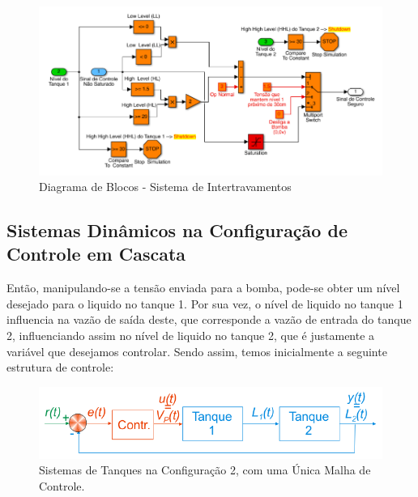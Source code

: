 \begin{figure}[h]
    \centering
    \includegraphics[width=15cm]{images/roteiro b/img ref teorico/diagrama_de_blocos_intertravamentos.PNG}
    \caption{Diagrama de Blocos - Sistema de Intertravamentos}
    \label{fig:diagrama_de_blocos}
\end{figure}

\newpage

\subsection{Sistemas Dinâmicos na Configuração de Controle em Cascata}

\hspace{4ex}Então, manipulando-se a tensão enviada para a bomba, pode-se obter um nível desejado para o liquido
no tanque 1. Por sua vez, o nível de liquido no tanque 1 influencia na vazão de saída deste, que corresponde a
vazão de entrada do tanque 2, influenciando assim no nível de liquido no tanque 2, que é justamente a variável
que desejamos controlar. Sendo assim, temos inicialmente a seguinte estrutura de controle:

\begin{figure}[h]
    \centering
    \includegraphics[width=15cm]{images/roteiro c/img ref teorico/tanque_config_2.PNG}
    \caption{Sistemas de Tanques na Configuração 2, com uma Única Malha de Controle.}
    \label{fig:tanque_config_2l}
\end{figure}

